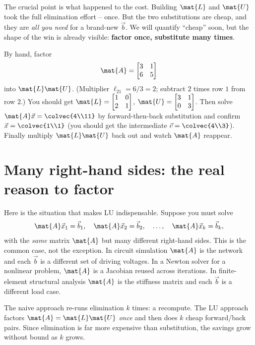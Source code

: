 The crucial point is what happened to the cost. Building $\mat{L}$ and $\mat{U}$ took the
full elimination effort -- once. But the two substitutions are cheap, and they are
\emph{all you need} for a brand-new $\vec{b}$. We will quantify ``cheap'' soon, but the
shape of the win is already visible: \textbf{factor once, substitute many times}.

\begin{labbox}
By hand, factor
\[
  \mat{A} = \begin{bmatrix} 3 & 1 \\ 6 & 5 \end{bmatrix}
\]
into $\mat{L}\mat{U}$. (Multiplier $\ell_{21}=6/3=2$; subtract $2$ times row $1$ from row
$2$.) You should get $\mat{L}=\begin{bmatrix}1&0\\2&1\end{bmatrix}$,
$\mat{U}=\begin{bmatrix}3&1\\0&3\end{bmatrix}$. Then solve $\mat{A}\vec{x}=\colvec{4\\11}$ by
forward-then-back substitution and confirm $\vec{x}=\colvec{1\\1}$ (you should get the
intermediate $\vec{c}=\colvec{4\\3}$). Finally multiply
$\mat{L}\mat{U}$ back out and watch $\mat{A}$ reappear.
\end{labbox}

\section{Many right-hand sides: the real reason to factor}
\label{ch09:many-rhs}

Here is the situation that makes LU indispensable. Suppose you must solve
\[
  \mat{A}\vec{x}_1 = \vec{b}_1,\quad \mat{A}\vec{x}_2 = \vec{b}_2,\quad \dots,\quad
  \mat{A}\vec{x}_k = \vec{b}_k,
\]
with the \emph{same} matrix $\mat{A}$ but many different right-hand sides. This is the
common case, not the exception. In circuit simulation $\mat{A}$ is the network and each
$\vec{b}$ is a different set of driving voltages. In a Newton solver for a nonlinear
problem, $\mat{A}$ is a Jacobian reused across iterations. In finite-element structural
analysis $\mat{A}$ is the stiffness matrix and each $\vec{b}$ is a different load case.

The naive approach re-runs elimination $k$ times: a recompute. The LU approach factors
$\mat{A}=\mat{L}\mat{U}$ \emph{once} and then does $k$ cheap forward/back pairs. Since
elimination is far more expensive than substitution, the savings grow without bound as $k$
grows.

